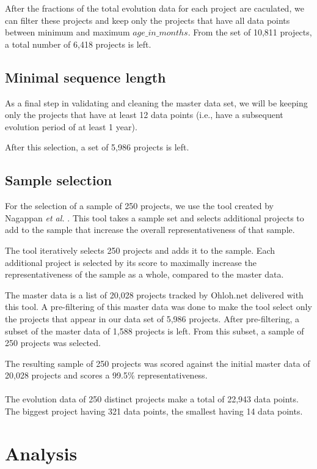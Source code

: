 After the fractions of the total evolution data for each project are caculated,
we can filter these projects and keep only the projects that have all data points
between minimum and maximum $age\_in\_months$. From the set of 10,811 projects,
a total number of 6,418 projects is left.

\subsection{Minimal sequence length}
As a final step in validating and cleaning the master data set, we will be
keeping only the projects that have at least 12 data points (i.e., have a
subsequent evolution period of at least 1 year).

After this selection, a set of 5,986 projects is left.

\subsection{Sample selection}
For the selection of a sample of 250 projects, we use the tool created by
Nagappan \emph{et al. }\rm\cite{nagappan}. This tool takes a sample set and
selects additional projects to add to the sample that increase the overall
representativeness of that sample.

The tool iteratively selects 250 projects and adds it to the sample. Each
additional project is selected by its score to maximally increase the
representativeness of the sample as a whole, compared to the master data.

The master data is a list of 20,028 projects tracked by Ohloh.net delivered with
this tool. A pre-filtering of this master data was done to make the tool select
only the projects that appear in our data set of 5,986 projects. After
pre-filtering, a subset of the master data of 1,588 projects is left. From this
subset, a sample of 250 projects was selected.

The resulting sample of 250 projects was scored against the initial master data
of 20,028 projects and scores a 99.5\% representativeness.

\paragraph{}
The evolution data of 250 distinct projects make a total of 22,943 data points.
The biggest project having 321 data points, the smallest having 14 data points.

\section{Analysis}

